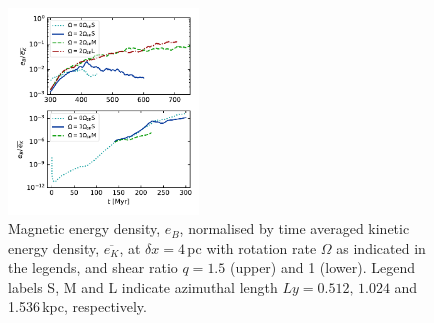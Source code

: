 \documentclass[preprint2]{aastex63}
\newcommand\dx{ {\delta x}}
\begin{document}
\begin{figure}
\centering
\includegraphics[trim=0.0cm 0.0cm 0.0cm 0.0cm,clip=true,width=0.45\textwidth]{csc_figs/eB-res-4eta.pdf}
\caption{
Magnetic energy density, $e_B$, normalised by time averaged kinetic energy 
density, $\overline{e_K}$, at $\dx=4$\,pc with rotation rate $\Omega$ as
indicated in the legends, and shear ratio $q=1.5$ (upper) and 1 (lower). 
Legend labels S, M and L indicate azimuthal length $Ly=0.512,\,1.024$ and 
1.536\,kpc, respectively. 
\label{fig:lsd-eB}
}
\end{figure}
\end{document}
